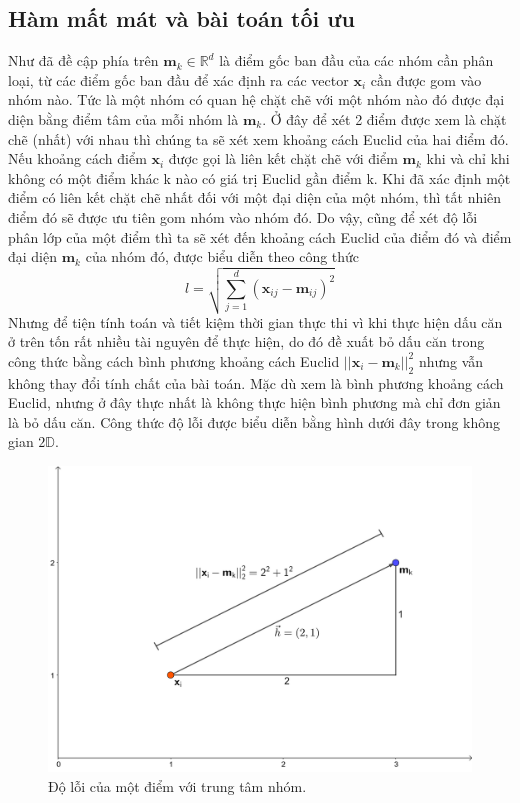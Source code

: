 \documentclass{article}
\begin{document}
	\subsection{Hàm mất mát và bài toán tối ưu}
	Như đã đề cập phía trên $\mathbf{m}_k \in \mathds{R}^d$ là điểm gốc ban đầu của các nhóm cần phân loại, từ các điểm gốc ban đầu để xác định ra các vector $\mathbf{x}_i$ cần được gom vào nhóm nào. Tức là một nhóm có quan hệ chặt chẽ với một nhóm nào đó được đại diện bằng điểm tâm của mỗi nhóm là $\mathbf{m}_k$. Ở đây để xét 2 điểm được xem là chặt chẽ (nhất) với nhau thì chúng ta sẽ xét xem khoảng cách Euclid của hai điểm đó. Nếu khoảng cách điểm $\mathbf{x}_i$ được gọi là liên kết chặt chẽ với điểm $\mathbf{m}_k$ khi và chỉ khi không có một điểm khác k nào có giá trị Euclid gần điểm k. Khi đã xác định một điểm có liên kết chặt chẽ nhất đối với một đại diện của một nhóm, thì tất nhiên điểm đó sẽ được ưu tiên gom nhóm vào nhóm đó. Do vậy, cũng để xét độ lỗi phân lớp của một điểm thì ta sẽ xét đến khoảng cách Euclid của điểm đó và điểm đại diện $\mathbf{m}_k$ của nhóm đó, được biểu diễn theo công thức
	$$
	l = \sqrt{\sum_{j = 1}^{d}(\mathbf{x}_{ij}-\mathbf{m}_{ij})^2}
	$$
	Nhưng để tiện tính toán và tiết kiệm thời gian thực thi vì khi thực hiện dấu căn ở trên tốn rất nhiều tài nguyên để thực hiện, do đó đề xuất bỏ dấu căn trong công thức bằng cách bình phương khoảng cách Euclid $||\mathbf{x}_i-\mathbf{m}_k||^2_2$ nhưng vẫn không thay đổi tính chất của bài toán. Mặc dù xem là bình phương khoảng cách Euclid, nhưng ở đây thực nhất là không thực hiện bình phương mà chỉ đơn giản là bỏ dấu căn. Công thức độ lỗi được biểu diễn bằng hình dưới đây trong không gian $2\mathds{D}$.
	\begin{figure}[h]
		\centering
		\includegraphics[width = 0.8\linewidth]{img/distance}
		\caption{Độ lỗi của một điểm với trung tâm nhóm.}
		\label{fig:figure1}
	\end{figure}
\end{document}
